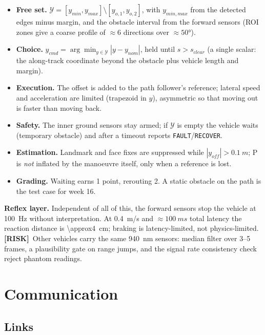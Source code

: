 \documentclass[11pt,a4paper]{article}
\newcommand{\mk}[2]{\textsf{\scriptsize\bfseries\colorbox{#1bg}{\color{#1}[#2]}}}
\newcommand{\RISK}{\mk{bad}{RISK}}
\newcommand{\code}[1]{\texttt{\small #1}}
\begin{document}
\begin{itemize}[leftmargin=6mm]
\item \textbf{Free set.} $\mathcal Y=[y_{min},y_{max}]\setminus[y_{o,1},y_{o,2}]$,
with $y_{min,max}$ from the detected edges minus margin, and the obstacle interval
from the forward sensors (ROI zones give a coarse profile of $\approx6$
directions over $\approx\ang{50}$).
\item \textbf{Choice.} $y_{cmd}=\arg\min_{y\in\mathcal Y}|y-y_{nom}|$, held until
$s>s_{clear}$ (a single scalar: the along-track coordinate beyond the obstacle
plus vehicle length and margin).
\item \textbf{Execution.} The offset is added to the path follower's reference;
lateral speed and acceleration are limited (trapezoid in $y$), asymmetric so that
moving out is faster than moving back.
\item \textbf{Safety.} The inner ground sensors stay armed; if $\mathcal Y$ is
empty the vehicle waits (temporary obstacle) and after a timeout reports
\code{FAULT}/\code{RECOVER}.
\item \textbf{Estimation.} Landmark and face fixes are suppressed while
$|y_{off}|>\qty{0.1}{m}$; P is \emph{not} inflated by the manoeuvre itself, only
when a reference is lost.
\item \textbf{Grading.} Waiting earns 1 point, rerouting 2. A static obstacle on
the path is the test case for week 16.
\end{itemize}

\textbf{Reflex layer.} Independent of all of this, the forward sensors stop the
vehicle at \qty{100}{Hz} without interpretation. At \qty{0.4}{m/s} and
$\approx\qty{100}{ms}$ total latency the reaction distance is
\qty{\approx4}{cm}; braking is latency-limited, not physics-limited.
\RISK\ Other vehicles carry the same \qty{940}{nm} sensors: median filter over
3--5 frames, a plausibility gate on range jumps, and the signal rate consistency
check reject phantom readings.
\clearpage
\section{Communication}\label{sec:comms}

\subsection{Links}
\end{document}
